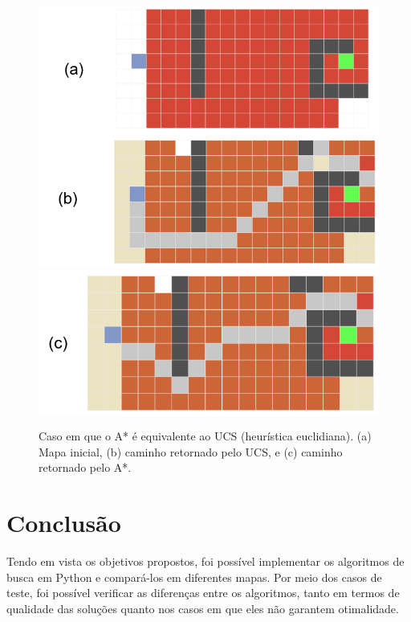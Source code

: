 \documentclass[letterpaper]{article} %
\begin{document}
\begin{figure}[htb]
	\centering 
    \caption{Caso em que o A* é equivalente ao UCS (heurística euclidiana). (a) Mapa inicial, 
	(b) caminho retornado pelo UCS, e (c)
	caminho retornado pelo A*.}
	\includegraphics[width=\columnwidth]{images/astar_equiv_ucs_p1.png}
	\includegraphics[width=\columnwidth]{images/astar_equiv_ucs_p2.png}
	\label{fig:astar_equiv_ucs}
\end{figure}


\section{Conclusão}

Tendo em vista os objetivos propostos, foi possível implementar os algoritmos de busca
em Python e compará-los em diferentes mapas. Por meio dos casos de teste, foi possível
verificar as diferenças entre os algoritmos, tanto em termos de qualidade das soluções quanto
nos casos em que eles não garantem otimalidade.



\end{document}
